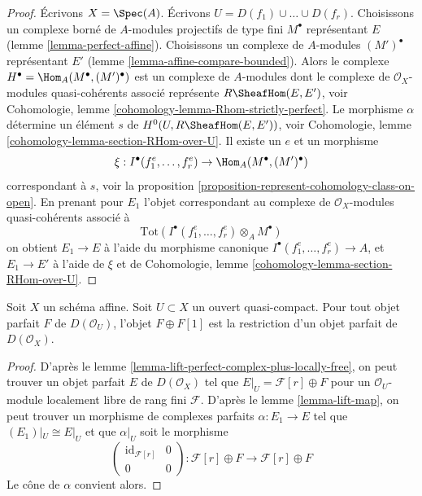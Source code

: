 \begin{proof}
Écrivons $X = \Spec(A)$. Écrivons $U = D(f_1) \cup \ldots \cup D(f_r)$. Choisissons
un complexe borné de $A$-modules projectifs de type fini $M^\bullet$ représentant
$E$ (lemme \ref{lemma-perfect-affine}). Choisissons un complexe de $A$-modules
$(M')^\bullet$ représentant $E'$ (lemme \ref{lemma-affine-compare-bounded}).
Alors le complexe $H^\bullet = \Hom_A(M^\bullet, (M')^\bullet)$
est un complexe de $A$-modules dont le complexe de
$\mathcal{O}_X$-modules quasi-cohérents associé représente $R\SheafHom(E, E')$, voir
Cohomologie, lemme \ref{cohomology-lemma-Rhom-strictly-perfect}.
Le morphisme $\alpha$ détermine un élément $s$ de $H^0(U, R\SheafHom(E, E'))$, voir
Cohomologie, lemme \ref{cohomology-lemma-section-RHom-over-U}.
Il existe un $e$ et un morphisme
$$
\xi : I^\bullet(f_1^e, \ldots, f_r^e) \to \Hom_A(M^\bullet, (M')^\bullet)
$$
correspondant à $s$, voir la
proposition \ref{proposition-represent-cohomology-class-on-open}.
En prenant pour $E_1$ l'objet correspondant au
complexe de $\mathcal{O}_X$-modules quasi-cohérents
associé à
$$
\text{Tot}(I^\bullet(f_1^e, \ldots, f_r^e) \otimes_A M^\bullet)
$$
on obtient $E_1 \to E$ à l'aide du morphisme canonique
$I^\bullet(f_1^e, \ldots, f_r^e) \to A$, et $E_1 \to E'$
à l'aide de $\xi$ et de
Cohomologie, lemme \ref{cohomology-lemma-section-RHom-over-U}.
\end{proof}

\begin{lemma}
\label{lemma-lift-perfect-complex-plus-shift}
Soit $X$ un schéma affine. Soit $U \subset X$ un ouvert quasi-compact.
Pour tout objet parfait $F$ de $D(\mathcal{O}_U)$,
l'objet $F \oplus F[1]$ est la restriction
d'un objet parfait de $D(\mathcal{O}_X)$.
\end{lemma}

\begin{proof}
D'après le lemme \ref{lemma-lift-perfect-complex-plus-locally-free},
on peut trouver un objet parfait $E$ de $D(\mathcal{O}_X)$
tel que $E|_U = \mathcal{F}[r] \oplus F$ pour un
$\mathcal{O}_U$-module localement libre de rang fini $\mathcal{F}$.
D'après le lemme \ref{lemma-lift-map}, on peut trouver un morphisme de
complexes parfaits $\alpha : E_1 \to E$ tel que $(E_1)|_U \cong E|_U$
et que $\alpha|_U$ soit le morphisme
$$
\left(
\begin{matrix}
\text{id}_{\mathcal{F}[r]} & 0 \\
0 & 0
\end{matrix}
\right)
:
\mathcal{F}[r] \oplus F \to \mathcal{F}[r] \oplus F
$$
Le cône de $\alpha$ convient alors.
\end{proof}

